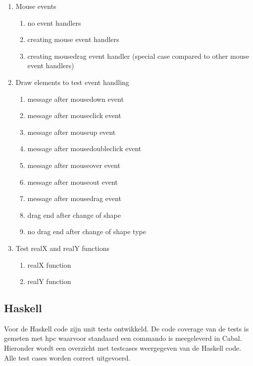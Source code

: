 \begin{enumerate}[label={T\arabic*}]
	\item \label{test:js:mouse} Mouse events
	\begin{enumerate}[label={T\arabic{enumi}.\arabic*}]
		\item \label{test:js:mouse:no} no event handlers
		\item \label{test:js:mouse:create} creating mouse event handlers
		\item \label{test:js:mouse:drag} creating mousedrag event handler (special case compared to other mouse event handlers)
	\end{enumerate}
	\item \label{test:js:mouse:draw} Draw elements to test event handling
	\begin{enumerate}[label={T\arabic{enumi}.\arabic*}]
		\item \label{test:js:draw:mousedown} message after mousedown event
		\item \label{test:js:draw:mouseclick} message after mouseclick event
		\item \label{test:js:draw:mouseup} message after mouseup event
		\item \label{test:js:draw:mousedoubleclick} message after mousedoubleclick event
		\item \label{test:js:draw:mouseover} message after mouseover event
		\item \label{test:js:draw:mouseout} message after mouseout event
		\item \label{test:js:draw:mousedrag} message after mousedrag event
		\item \label{test:js:draw:mousedragend} drag end after change of shape
		\item \label{test:js:draw:mousenodragend} no drag end after change of shape type
	\end{enumerate}
	\item Test realX and realY functions
	\begin{enumerate}[label={T\arabic{enumi}.\arabic*}]
		\item \label{test:js:func:realX} realX function
		\item \label{test:js:func:realY} realY function
	\end{enumerate}
	\setcounter{startvaluetest}{\value{enumi}}
\end{enumerate}

\subsection{Haskell}
Voor de Haskell code zijn unit tests ontwikkeld. De code coverage van de tests is gemeten met hpc waarvoor standaard een commando is meegeleverd in Cabal. Hieronder wordt een overzicht met testcases weergegeven van de Haskell code. Alle test cases worden correct uitgevoerd.


